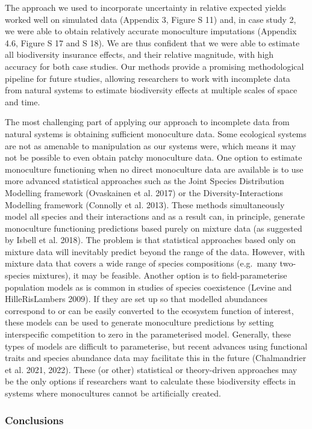 \documentclass[
  letterpaper,
  DIV=11,
  numbers=noendperiod]{scrartcl}
\begin{document}
The approach we used to incorporate uncertainty in relative expected
yields worked well on simulated data (Appendix 3, Figure S 11) and, in
case study 2, we were able to obtain relatively accurate monoculture
imputations (Appendix 4.6, Figure S 17 and S 18). We are thus confident
that we were able to estimate all biodiversity insurance effects, and
their relative magnitude, with high accuracy for both case studies. Our
methods provide a promising methodological pipeline for future studies,
allowing researchers to work with incomplete data from natural systems
to estimate biodiversity effects at multiple scales of space and time.

The most challenging part of applying our approach to incomplete data
from natural systems is obtaining sufficient monoculture data. Some
ecological systems are not as amenable to manipulation as our systems
were, which means it may not be possible to even obtain patchy
monoculture data. One option to estimate monoculture functioning when no
direct monoculture data are available is to use more advanced
statistical approaches such as the Joint Species Distribution Modelling
framework (Ovaskainen et al. 2017) or the Diversity-Interactions
Modelling framework (Connolly et al. 2013). These methods simultaneously
model all species and their interactions and as a result can, in
principle, generate monoculture functioning predictions based purely on
mixture data (as suggested by Isbell et al. 2018). The problem is that
statistical approaches based only on mixture data will inevitably
predict beyond the range of the data. However, with mixture data that
covers a wide range of species compositions (e.g.~many two-species
mixtures), it may be feasible. Another option is to field-parameterise
population models as is common in studies of species coexistence (Levine
and HilleRisLambers 2009). If they are set up so that modelled
abundances correspond to or can be easily converted to the ecosystem
function of interest, these models can be used to generate monoculture
predictions by setting interspecific competition to zero in the
parameterised model. Generally, these types of models are difficult to
parameterise, but recent advances using functional traits and species
abundance data may facilitate this in the future (Chalmandrier et al.
2021, 2022). These (or other) statistical or theory-driven approaches
may be the only options if researchers want to calculate these
biodiversity effects in systems where monocultures cannot be
artificially created.

\subsubsection{Conclusions}\label{conclusions}
\end{document}
